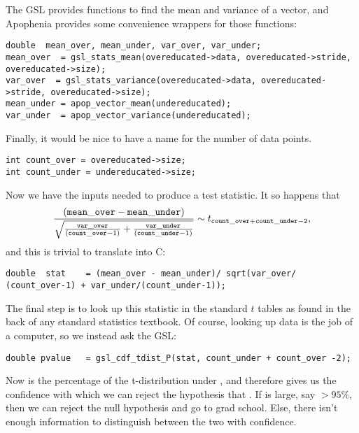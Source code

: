 The GSL 
provides functions to find the mean and variance of a vector, and 
Apophenia provides some convenience wrappers for those functions:

\begin{lstlisting}
double	mean_over, mean_under, var_over, var_under;
mean_over  = gsl_stats_mean(overeducated->data, overeducated->stride, overeducated->size);
var_over  = gsl_stats_variance(overeducated->data, overeducated->stride, overeducated->size);
mean_under = apop_vector_mean(undereducated);
var_under  = apop_vector_variance(undereducated);
\end{lstlisting}

Finally, it would be nice to have a name for the number of data points.
\begin{lstlisting}
int count_over = overeducated->size;
int count_under = undereducated->size;
\end{lstlisting}

Now we have the inputs needed to produce a test statistic. It so happens
that 
$$
\frac{({\tt mean\_over - mean\_under})}
{\sqrt{\frac{{\tt var\_over}}{({\tt count\_over}-1)}+ \frac{{\tt var\_under}}{({\tt count\_under}-1)}}} \sim t_{\tt count\_over + count\_under - 2},
$$
and this is trivial to translate into C: 
\begin{lstlisting}
double	stat    = (mean_over - mean_under)/ sqrt(var_over/ (count_over-1) + var_under/(count_under-1));
\end{lstlisting}

The final step is to look up this statistic in the standard $t$ tables
as found in the back of any standard statistics textbook. Of course,
looking up data is the job of a computer, so we instead ask the GSL:
\begin{lstlisting}
double pvalue   = gsl_cdf_tdist_P(stat, count_under + count_over -2);
\end{lstlisting}
Now  is the percentage of the t-distribution under
, and therefore gives us the confidence with which we can
reject the hypothesis that . If
 is large, say $> 95\%$, then we can reject the null
hypothesis and go to grad school. Else, there isn't enough information
to distinguish between the two with confidence.

